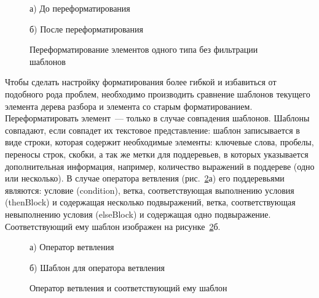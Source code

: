 %    
\begin{figure}[ht]
\noindent\begin{minipage}{.5\textwidth}
    
\caption*{а) До переформатирования}    
\end{minipage}\hfill
\begin{minipage}{.5\textwidth}
    
\caption*{б) После переформатирования}    
\end{minipage}
\caption{Переформатирование элементов одного типа без фильтрации шаблонов} 
\label{templates}
\end{figure}


Чтобы сделать настройку форматирования более гибкой и избавиться от подобного рода проблем, необходимо производить сравнение шаблонов текущего элемента дерева разбора и элемента со старым форматированием. 
Переформатировать элемент~--- только в случае совпадения шаблонов.
Шаблоны совпадают, если совпадет их текстовое представление: шаблон записывается в виде строки, которая содержит необходимые элементы: ключевые слова, пробелы, переносы строк, скобки, а так же метки для поддеревьев, в которых указывается дополнительная информация, например, количество выражений в поддереве (одно или несколько).
В случае оператора ветвления (рис.~\ref{iftmpltcode}а) его поддеревьями являются: условие (condition), ветка, соответствующая выполнению условия (thenBlock) и содержащая несколько подвыражений, ветка, соответствующая невыполнению условия (elseBlock) и содержащая одно подвыражение. %
Соответствующий ему шаблон изображен на рисунке~\ref{iftmpltcode}б.
\begin{figure}[ht]
\noindent\begin{minipage}{.5\textwidth}
    
\caption*{а) Оператор ветвления}    
\end{minipage}\hfill
\begin{minipage}{.5\textwidth}
    
\caption*{б) Шаблон для оператора ветвления}    
\end{minipage}
\caption{Оператор ветвления и соответствующий ему шаблон}    
\label{iftmpltcode}
\end{figure}

